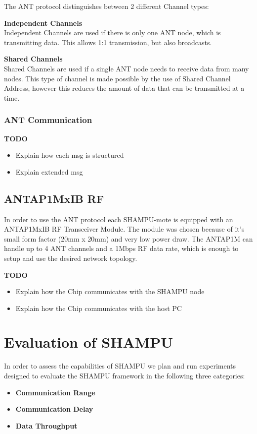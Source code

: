 The ANT protocol distinguishes between 2 different Channel types:
\begin{description}
\item{\textbf{Independent Channels}} \hfill \\ Independent Channels are used if there is only one ANT node, which is transmitting data. This allows 1:1 transmission, but also broadcasts.
\item{\textbf{Shared Channels}} \hfill \\ Shared Channels are used if a single ANT node needs to receive data from many nodes. This type of channel is made possible by the use of Shared Channel Address, however this reduces the amount of data that can be transmitted at a time.
\end{description}

\subsection{ANT Communication}
\textbf{TODO}
\begin{itemize}
	\item{Explain how each msg is structured}
	\item{Explain extended msg }
\end{itemize}

\section{ANTAP1MxIB RF}
In order to use the ANT protocol each SHAMPU-mote is equipped with an ANTAP1MxIB RF Transceiver Module. The module was chosen because of it's small form factor (20mm x 20mm) and very low power draw. The ANTAP1M can handle up to 4 ANT channels and a 1Mbps RF data rate, which is enough to setup and use the desired network topology.

\textbf{TODO}
\begin{itemize}
	\item{Explain how the Chip communicates with the SHAMPU node}
	\item{Explain how the Chip communicates with the host PC}
\end{itemize}

\chapter{Evaluation of SHAMPU}
In order to assess the capabilities of SHAMPU we plan and run experiments designed to evaluate the SHAMPU framework in the following three categories:
\begin{itemize}
	\item{\textbf{Communication Range}} 
	\item{\textbf{Communication Delay}} 
	\item{\textbf{Data Throughput}} 
\end{itemize}

